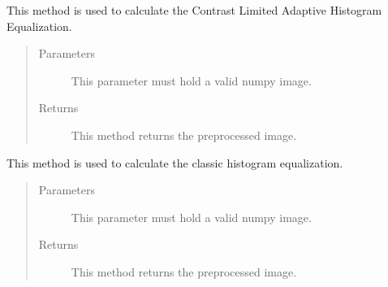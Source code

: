 \documentclass[letterpaper,10pt,english,openany,oneside]{sphinxmanual}
\begin{document}
\begin{fulllineitems}
\begin{fulllineitems}
\label{\detokenize{PreProcessing:sbd.PreProcessing.PreProcessing.applyTransformOnImgSeq}}
\end{fulllineitems}


\begin{fulllineitems}
\label{\detokenize{PreProcessing:sbd.PreProcessing.PreProcessing.claHE}}
This method is used to calculate the Contrast Limited Adaptive Histogram Equalization.
\begin{quote}\begin{description}
\item[{Parameters}] \leavevmode
{} \textendash{} This parameter must hold a valid numpy image.

\item[{Returns}] \leavevmode
This method returns the pre\sphinxhyphen{}processed image.

\end{description}\end{quote}

\end{fulllineitems}


\begin{fulllineitems}
\label{\detokenize{PreProcessing:sbd.PreProcessing.PreProcessing.classicHE}}
This method is used to calculate the classic histogram equalization.
\begin{quote}\begin{description}
\item[{Parameters}] \leavevmode
{} \textendash{} This parameter must hold a valid numpy image.

\item[{Returns}] \leavevmode
This method returns the pre\sphinxhyphen{}processed image.


\end{description}
\end{quote}
\end{fulllineitems}
\end{fulllineitems}
\end{document}
